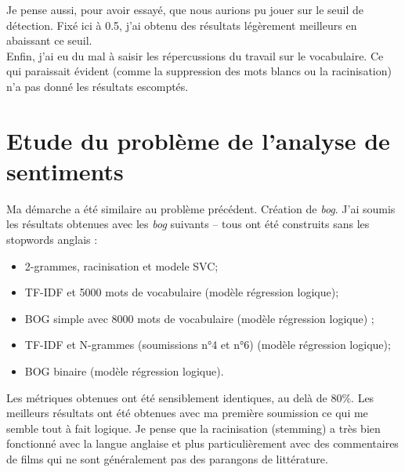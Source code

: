 \documentclass[a4paper,12pt]{article}
\begin{document}
Je pense aussi, pour avoir essayé, que nous aurions pu jouer sur le seuil de détection. Fixé ici à 0.5, j'ai obtenu des résultats légèrement meilleurs en abaissant ce seuil. \\

Enfin, j'ai eu du mal à saisir les répercussions du travail sur le vocabulaire. Ce qui paraissait évident (comme la suppression des mots blancs ou la racinisation) n'a pas donné les résultats escomptés.

\section{Etude du problème de l'analyse de sentiments}

Ma démarche a été similaire au problème précédent. Création de \textit{bog}. J'ai soumis les résultats obtenues avec les \textit{bog} suivants -- tous ont été construits sans les stopwords anglais :
\begin{itemize}
\item 2-grammes, racinisation et modele SVC;
\item TF-IDF et 5000 mots de vocabulaire (modèle régression logique);
\item BOG simple avec 8000 mots de vocabulaire (modèle régression logique) ;
\item TF-IDF et N-grammes (soumissions n°4 et n°6) (modèle régression logique);
\item BOG binaire (modèle régression logique).
\end{itemize}

Les métriques obtenues ont été sensiblement identiques, au delà de 80\%. Les meilleurs résultats ont été obtenues avec ma première soumission ce qui me semble tout à fait logique. Je pense que la racinisation (stemming) a très bien fonctionné avec la langue anglaise et plus particulièrement avec des commentaires de films qui ne sont généralement pas des parangons de littérature.
\end{document}
